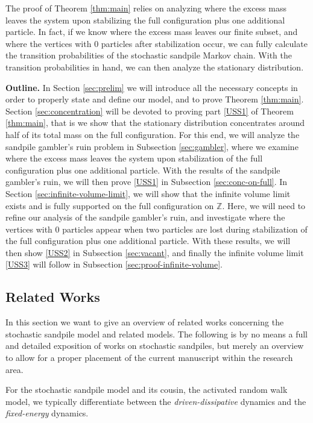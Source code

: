 \documentclass[11pt]{article}
\newcommand{\Z}{\mathbb{Z}}
\begin{document}
The proof of Theorem \ref{thm:main} relies on analyzing where the excess mass leaves the system upon stabilizing the full configuration plus one additional particle. In fact, if we know where the excess mass leaves our finite subset, and where the vertices with $0$ particles after stabilization occur, we can fully calculate the transition probabilities of the stochastic sandpile Markov chain. With the transition probabilities in hand, we can then analyze the stationary distribution.

\textbf{Outline.} In Section \ref{sec:prelim} we will introduce all the necessary concepts in order to properly state and define our model, and to prove Theorem \ref{thm:main}. Section \ref{sec:concentration} will be devoted to proving part \ref{USS1} of Theorem \ref{thm:main}, that is we show that the stationary distribution concentrates around half of its total mass on the full configuration. For this end, we will analyze the sandpile gambler's ruin problem in Subsection \ref{sec:gambler}, where we examine where the excess mass leaves the system upon stabilization of the full configuration plus one additional particle. With the results of the sandpile gambler's ruin, we will then prove \ref{USS1} in Subsection \ref{sec:conc-on-full}. In Section \ref{sec:infinite-volume-limit}, we will show that the infinite volume limit exists and is fully supported on the full configuration on $\Z$. Here, we will need to refine our analysis of the sandpile gambler's ruin, and investigate where the vertices with $0$ particles appear when two particles are lost during stabilization of the full configuration plus one additional particle. With these results, we will then show \ref{USS2} in Subsection \ref{sec:vacant}, and finally the infinite volume limit \ref{USS3} will follow in Subsection \ref{sec:proof-infinite-volume}.

\subsection{Related Works}\label{sec:relwork}
In this section we want to give an overview of related works concerning the stochastic sandpile model and related models. The following is by no means a full and detailed exposition of works on stochastic sandpiles, but merely an overview to allow for a proper placement of the current manuscript within the research area.

For the stochastic sandpile model and its cousin, the activated random walk model, we typically differentiate between the {\it driven-dissipative} dynamics and the {\it fixed-energy} dynamics.
\end{document}
